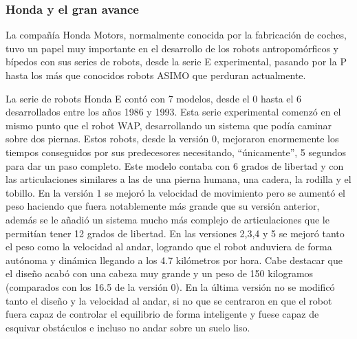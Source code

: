 \subsubsection{Honda y el gran avance}
La compañía Honda Motors, normalmente conocida por la fabricación de coches, tuvo un papel muy importante en el desarrollo de los robots antropomórficos y bípedos con sus series de robots, desde la serie E experimental, pasando por la P hasta los más que conocidos robots ASIMO que perduran actualmente.

\vspace{10px}

La serie de robots Honda E contó con 7 modelos, desde el 0 hasta el 6 desarrollados entre los años 1986 y 1993. Esta serie experimental comenzó en el mismo punto que el robot WAP, desarrollando un sistema que podía caminar sobre dos piernas. Estos robots, desde la versión 0, mejoraron enormemente los tiempos conseguidos por sus predecesores necesitando, ``únicamente'', 5 segundos para dar un paso completo. Este modelo contaba con 6 grados de libertad y con las articulaciones similares a las de una pierna humana, una cadera, la rodilla y el tobillo. En la versión 1 se mejoró la velocidad de movimiento pero se aumentó el peso haciendo que fuera notablemente más grande que su versión anterior, además se le añadió un sistema mucho más complejo de articulaciones que le permitían tener 12 grados de libertad. En las versiones 2,3,4 y 5 se mejoró tanto el peso como la velocidad al andar, logrando que el robot anduviera de forma autónoma y dinámica llegando a los 4.7 kilómetros por hora. Cabe destacar que el diseño acabó con una cabeza muy grande y un peso de 150 kilogramos (comparados con los 16.5 de la versión 0). En la última versión no se modificó tanto el diseño y la velocidad al andar, si no que se centraron en que el robot fuera capaz de controlar el equilibrio de forma inteligente y fuese capaz de esquivar obstáculos e incluso no andar sobre un suelo liso.

\vspace{10px}

